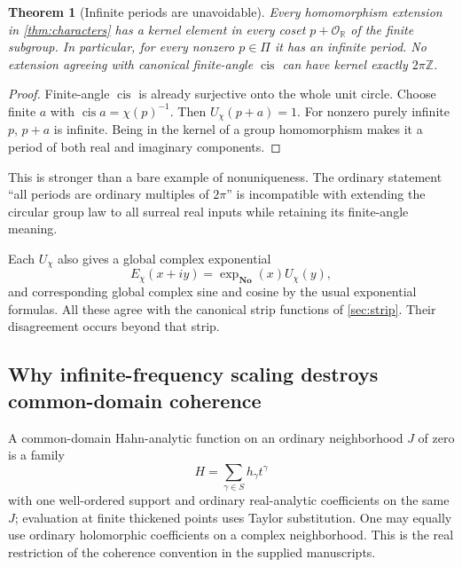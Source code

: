 \documentclass[11pt]{article}
\numberwithin{equation}{section}
\newtheorem{theorem}{Theorem}[section]
\theoremstyle{definition}
\newcommand{\No}{\mathbf{No}}
\newcommand{\R}{\mathbb R}
\newcommand{\Z}{\mathbb Z}
\newcommand{\OO}{\mathcal O}
\newcommand{\cis}{\operatorname{cis}}
\begin{document}
\begin{theorem}[Infinite periods are unavoidable]\label{thm:infiniteperiods}
Every homomorphism extension in \cref{thm:characters} has a kernel element in every coset $p+\OO_{\R}$ of the finite subgroup. In particular, for every nonzero $p\in\Pi$ it has an infinite period. No extension agreeing with canonical finite-angle $\cis$ can have kernel exactly $2\pi\Z$.
\end{theorem}
\begin{proof}
Finite-angle $\cis$ is already surjective onto the whole unit circle. Choose finite $a$ with $\cis a=\chi(p)^{-1}$. Then $U_\chi(p+a)=1$. For nonzero purely infinite $p$, $p+a$ is infinite. Being in the kernel of a group homomorphism makes it a period of both real and imaginary components.
\end{proof}
This is stronger than a bare example of nonuniqueness. The ordinary statement ``all periods are ordinary multiples of $2\pi$'' is incompatible with extending the circular group law to all surreal real inputs while retaining its finite-angle meaning.

Each $U_\chi$ also gives a global complex exponential
\[
 E_\chi(x+iy)=\exp_{\No}(x)U_\chi(y),
\]
and corresponding global complex sine and cosine by the usual exponential formulas. All these agree with the canonical strip functions of \cref{sec:strip}. Their disagreement occurs beyond that strip.

\subsection{Why infinite-frequency scaling destroys common-domain coherence}
A common-domain Hahn-analytic function on an ordinary neighborhood $J$ of zero is a family
\[
 H=\sum_{\gamma\in S}h_\gamma t^\gamma
\]
with one well-ordered support and ordinary real-analytic coefficients on the same $J$; evaluation at finite thickened points uses Taylor substitution. One may equally use ordinary holomorphic coefficients on a complex neighborhood. This is the real restriction of the coherence convention in the supplied manuscripts.
\end{document}
